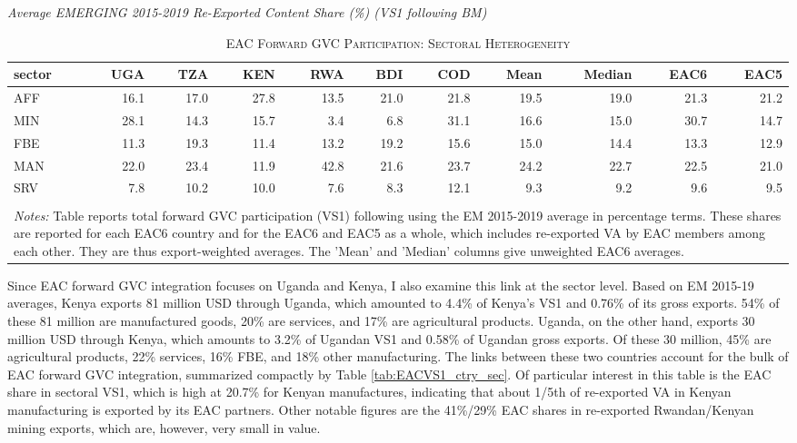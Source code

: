 \documentclass[a4paper]{article}
\begin{document}
\begin{table}[h]  
\centering
\caption{\label{tab:EACVS1_sec}\textsc{EAC Forward GVC Participation: Sectoral Heterogeneity}}
\small{\textit{Average EMERGING 2015-2019 Re-Exported Content Share (\%) (VS1 following BM)}} \\
\vspace{1mm}
\begin{tabular}{lrrrrrrrrrr}
  \toprule
sector & UGA & TZA & KEN & RWA & BDI & COD & Mean & Median & EAC6 & EAC5 \\ 
  \midrule
AFF & 16.1 & 17.0 & 27.8 & 13.5 & 21.0 & 21.8 & 19.5 & 19.0 & 21.3 & 21.2\\ 
  MIN & 28.1 & 14.3 & 15.7 & 3.4 & 6.8 & 31.1 & 16.6 & 15.0 & 30.7 & 14.7\\ 
  FBE & 11.3 & 19.3 & 11.4 & 13.2 & 19.2 & 15.6 & 15.0 & 14.4 & 13.3 & 12.9\\ 
  MAN & 22.0 & 23.4 & 11.9 & 42.8 & 21.6 & 23.7 & 24.2 & 22.7 & 22.5 & 21.0\\ 
  SRV & 7.8 & 10.2 & 10.0 & 7.6 & 8.3 & 12.1 & 9.3 & 9.2 & 9.6 & 9.5\\
   \bottomrule \\ [-0.9em]
\multicolumn{11}{l}{\parbox{0.85\textwidth}{\scriptsize
\textit{Notes:} Table reports total forward GVC participation (VS1) following  \citet{borin2019measuring} using the EM 2015-2019 average in percentage terms. These shares are reported for each EAC6 country and for the EAC6 and EAC5 as a whole, which includes re-exported VA by EAC members among each other. They are thus export-weighted averages. The 'Mean' and 'Median' columns give unweighted EAC6 averages.}}
\end{tabular}
\end{table}

Since EAC forward GVC integration focuses on Uganda and Kenya, I also examine this link at the sector level. Based on EM 2015-19 averages, Kenya exports 81 million USD through Uganda, which amounted to 4.4\% of Kenya's VS1 and 0.76\% of its gross exports. 54\% of these 81 million are manufactured goods, 20\% are services, and 17\% are agricultural products. Uganda, on the other hand, exports 30 million USD through Kenya, which amounts to 3.2\% of Ugandan VS1 and 0.58\% of Ugandan gross exports. Of these 30 million, 45\% are agricultural products, 22\% services, 16\% FBE, and 18\% other manufacturing. The links between these two countries account for the bulk of EAC forward GVC integration, summarized compactly by Table \ref{tab:EACVS1_ctry_sec}. Of particular interest in this table is the EAC share in sectoral VS1, which is high at 20.7\% for Kenyan manufactures, indicating that about 1/5th of re-exported VA in Kenyan manufacturing is exported by its EAC partners. Other notable figures are the 41\%/29\% EAC shares in re-exported Rwandan/Kenyan mining exports, which are, however, very small in value. \newline
\end{document}
